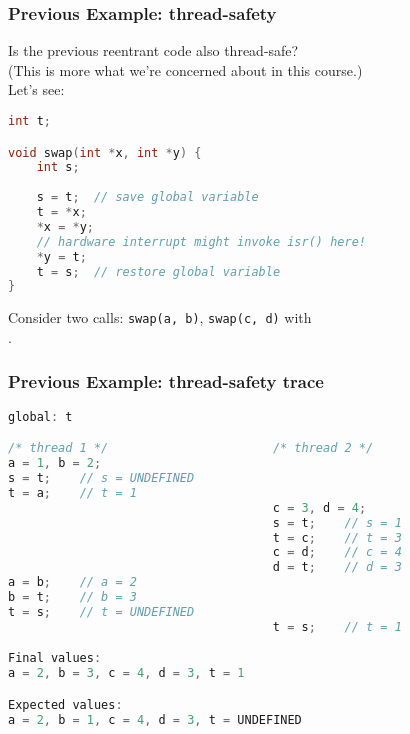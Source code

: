 \begin{frame}[fragile]
  \frametitle{Previous Example: thread-safety}

  
  Is the previous reentrant code also thread-safe?\\

  (This is more what we're concerned about in this course.)\\[1em]

  Let's see:
  \begin{lstlisting}[language=C]
int t;

void swap(int *x, int *y) {
    int s;
 
    s = t;  // save global variable
    t = *x;
    *x = *y;
    // hardware interrupt might invoke isr() here!
    *y = t;
    t = s;  // restore global variable
}
  \end{lstlisting}
  
  Consider two calls: {\tt swap(a, b)}, {\tt swap(c, d)} with\\
  .
  
\end{frame}

\begin{frame}[fragile]
  \frametitle{Previous Example: thread-safety trace}

  
  \begin{lstlisting}[language=C]
global: t

/* thread 1 */                       /* thread 2 */
a = 1, b = 2;
s = t;    // s = UNDEFINED
t = a;    // t = 1
                                     c = 3, d = 4;
                                     s = t;    // s = 1
                                     t = c;    // t = 3
                                     c = d;    // c = 4
                                     d = t;    // d = 3
a = b;    // a = 2
b = t;    // b = 3
t = s;    // t = UNDEFINED
                                     t = s;    // t = 1

Final values:
a = 2, b = 3, c = 4, d = 3, t = 1

Expected values:
a = 2, b = 1, c = 4, d = 3, t = UNDEFINED
  \end{lstlisting}
  
\end{frame}


